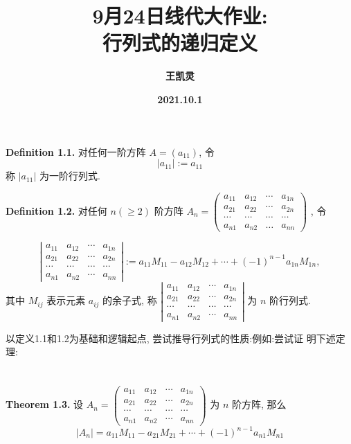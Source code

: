 \documentclass[]{ctexart}
\title{\textbf{
		\zihao{1}9月24日线代大作业:\\
		\zihao{2}行列式的递归定义}}
\author{\textbf{王凯灵}}
\date{\textbf{2021.10.1}}
\begin{document}
	\maketitle

\section*{}

\noindent\textbf{Definition 1.1.} 对任何一阶方阵 $A=\left(a_{11}\right)$, 令
$$
\left|a_{11}\right|:=a_{11}
$$
称 $\left|a_{11}\right|$ 为一阶行列式.

\noindent\textbf{Definition 1.2.} 对任何 $n(\geq 2)$ 阶方阵 $A_{n}=\left(\begin{array}{cccc}
	a_{11} & a_{12} & \cdots & a_{1n} \\
	a_{21} & a_{22} & \cdots & a_{2n} \\
	\cdots & \cdots & \cdots & \cdots \\
	a_{n1} & a_{n2} & \ldots & a_{nn}\end{array}\right)$
, 令



$$
\left|\begin{array}{cccc}
	a_{11} & a_{12} & \cdots & a_{1 n} \\
	a_{21} & a_{22} & \cdots & a_{2 n} \\
	\cdots & \cdots & \cdots & \cdots \\
	a_{n 1} & a_{n 2} & \cdots & a_{n n}
\end{array}\right|
:=a_{11} M_{11}-a_{12} M_{12}+\cdots+(-1)^{n-1} a_{1 n} M_{1 n},
$$
其中 $M_{i j}$ 表示元素 $a_{i j}$ 的余子式, 称
$\left|\begin{array}{cccc}
	a_{11} & a_{12} & \cdots & a_{1 n} \\
	a_{21} & a_{22} & \cdots & a_{2 n} \\
	\cdots & \cdots & \cdots & \cdots \\
	a_{n 1} & a_{n 2} & \cdots & a_{n n}
\end{array}\right|$
为 $n$ 阶行列式.

以定义1.1和1.2为基础和逻辑起点, 尝试推导行列式的性质:例如:尝试证 明下述定理:

\section*{}

\noindent\textbf{Theorem 1.3.} 设
$A_{n}=\left(\begin{array}{cccc}
	a_{11} & a_{12} & \cdots & a_{1 n} \\
	a_{21} & a_{22} & \cdots & a_{2 n} \\
	\cdots & \cdots & \cdots & \cdots \\
	a_{n 1} & a_{n 2} & \cdots & a_{n n}
\end{array}\right)$
为 $n$ 阶方阵, 那么
$$
\left|A_{n}\right|=a_{11} M_{11}-a_{21} M_{21}+\cdots+(-1)^{n-1} a_{n 1} M_{n 1}
$$
\end{document}
